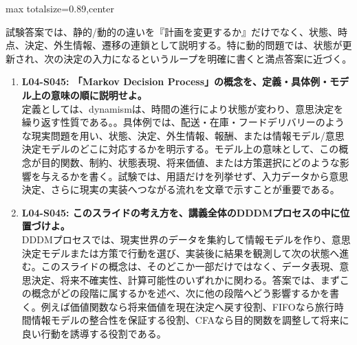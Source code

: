 \begin{minipage}[t]{0.58\textwidth}
\begin{adjustbox}{max totalsize={\textwidth}{0.89\textheight},center}
\begin{minipage}{\textwidth}
試験答案では、静的/動的の違いを『計画を変更するか』だけでなく、状態、時点、決定、外生情報、遷移の連鎖として説明する。特に動的問題では、状態が更新され、次の決定の入力になるというループを明確に書くと満点答案に近づく。\par{}\begin{enumerate}\item \textbf{L04-S045: 「Markov Decision Process」の概念を、定義・具体例・モデル上の意味の順に説明せよ。}\\定義としては、dynamismは、時間の進行により状態が変わり、意思決定を繰り返す性質である。。具体例では、配送・在庫・フードデリバリーのような現実問題を用い、状態、決定、外生情報、報酬、または情報モデル/意思決定モデルのどこに対応するかを明示する。モデル上の意味として、この概念が目的関数、制約、状態表現、将来価値、または方策選択にどのような影響を与えるかを書く。試験では、用語だけを列挙せず、入力データから意思決定、さらに現実の実装へつながる流れを文章で示すことが重要である。\item \textbf{L04-S045: このスライドの考え方を、講義全体のDDDMプロセスの中に位置づけよ。}\\DDDMプロセスでは、現実世界のデータを集約して情報モデルを作り、意思決定モデルまたは方策で行動を選び、実装後に結果を観測して次の状態へ進む。このスライドの概念は、そのどこか一部だけではなく、データ表現、意思決定、将来不確実性、計算可能性のいずれかに関わる。答案では、まずこの概念がどの段階に属するかを述べ、次に他の段階へどう影響するかを書く。例えば価値関数なら将来価値を現在決定へ戻す役割、FIFOなら旅行時間情報モデルの整合性を保証する役割、CFAなら目的関数を調整して将来に良い行動を誘導する役割である。\end{enumerate}
\end{minipage}
\end{adjustbox}
\end{minipage}


